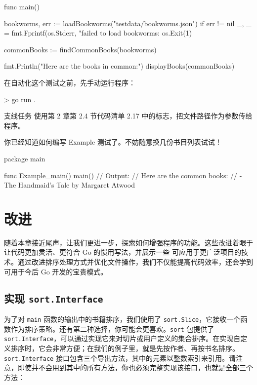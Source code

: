 \begin{gocode}[title={代码清单 3.20 \texttt{main.go}：\texttt{main} 函数}]
func main() {
    bookworms, err := loadBookworms("testdata/bookworms.json")
    if err != nil {
        _, _ = fmt.Fprintf(os.Stderr, "failed to load bookworms: %
        os.Exit(1)
    }

    commonBooks := findCommonBooks(bookworms)

    fmt.Println("Here are the books in common:")
    displayBooks(commonBooks)
}
\end{gocode}

在自动化这个测试之前，先手动运行程序：

\begin{shellcode}[]
> go run .
\end{shellcode}

\begin{infobox}{支线任务}
使用第 2 章第 2.4 节代码清单 2.17 中的标志，把文件路径作为参数传给程序。
\end{infobox}

你已经知道如何编写 Example 测试了。不妨随意换几份书目列表试试！

\begin{gocode}[title={代码清单 3.21 \texttt{main\_internal\_test.go}：测试 \texttt{main}}]
package main

func Example_main() {
    main()
    // Output:
    // Here are the common books:
    // - The Handmaid's Tale by Margaret Atwood
}
\end{gocode}

\section{改进}

随着本章接近尾声，让我们更进一步，探索如何增强程序的功能。这些改进着眼于让代码更加灵活、更符合 Go 的惯用写法，并展示一些
可应用于更广泛项目的技术。通过改进排序处理方式并优化文件操作，我们不仅能提高代码效率，还会学到可用于今后 Go 开发的宝贵模式。

\subsection{实现 \texttt{sort.Interface}}

为了对 \texttt{main} 函数的输出中的书籍排序，我们使用了 \texttt{sort.Slice}，它接收一个函数作为排序策略。还有第二种选择，你可能会更喜欢。\texttt{sort} 包提供了 \texttt{sort.Interface}，可以通过实现它来对切片或用户定义的集合排序。在实现自定义排序时，它会非常方便；在我们的例子里，就是先按作者、再按书名排序。\texttt{sort.Interface} 接口包含三个导出方法，其中的元素以整数索引来引用。请注意，即使并不会用到其中的所有方法，你也必须完整实现该接口，也就是全部三个方法：

